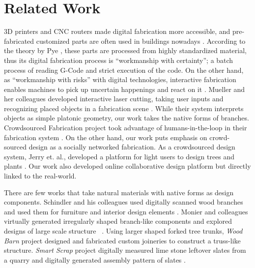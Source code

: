 \section{Related Work}
3D printers and CNC routers made digital fabrication more accessible, and pre-fabricated customized parts are often used in buildings nowadays \cite{knaack2012prefabricated}.
According to the theory by Pye , these parts are processed from highly standardized material, thus its digital fabrication process is ``workmanship with certainty''; a batch process of reading G-Code and strict execution of the code.
On the other hand, as ``workmanship with risks'' with digital technologies, interactive fabrication enables machines to pick up uncertain happenings and react on it \cite{willis2011interactive}.
Mueller and her colleagues developed interactive laser cutting, taking user inputs and recognizing placed objects in a fabrication scene \cite{Mueller:2012:ICI:2380116.2380191}.
While their system interprets objects as simple platonic geometry, our work takes the native forms of branches.
Crowdsourced Fabrication project took advantage of humans-in-the-loop in their fabrication system \cite{lafreniere2016crowdsourced}.
On the other hand, our work puts emphasis on crowd-sourced design as a socially networked fabrication.
As a crowdsourced design system, Jerry et. al., developed a platform for light users to design trees and plants \cite{talton2009exploratory}.
Our work also developed online collaborative design platform but directly linked to the real-world.

There are few works that take natural materials with native forms as design components.
Schindler and his colleagues used digitally scanned wood branches and used them for furniture and interior design elements \cite{schindler2014processing}.
Monier and colleagues virtually generated irregularly shaped branch-like components and explored designs of large scale structure ~\cite{monier2013use}.
Using larger shaped forked tree trunks, \textit{Wood Barn} project designed and fabricated custom joineries to construct a truss-like structure\cite{woodbarn}.
\textit{Smart Scrap} project digitally measured lime stone leftover slates from a quarry and digitally generated assembly pattern of slates \cite{smartscrap}.\\

